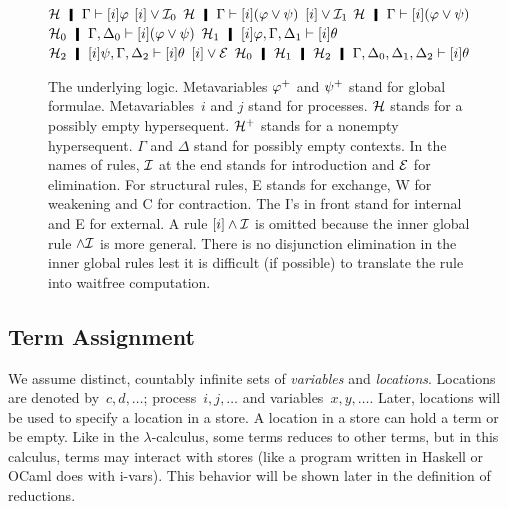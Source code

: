 \begin{figure}
  \UnaryRule
   {$\hyper\hmid\Gamma\vdash[i]\varphi$}
   {$[i]\vee\mathcal I_0$}
   {$\hyper\hmid\Gamma\vdash[i](\varphi\vee\psi)$}
   \hfill
  \UnaryRule{$\hyper\hmid\Gamma\vdash[i]\psi$}
   {$[i]\vee\mathcal I_1$}
   {$\hyper\hmid\Gamma\vdash[i](\varphi\vee\psi)$}
   \TrinaryRule
   {$\hyper_0\hmid\G,\D_0\vdash[i](\phi\vee\psi)$}
   {$\hyper_1\hmid[i]\varphi, \G,\D_1\vdash[i]\theta$}
   {$\hyper_2\hmid[i]\psi,    \G,\D_2\vdash[i]\theta$}
   {$[i]\vee\mathcal E$}
   {$\hyper_0\hmid\hyper_1\hmid\hyper_2\hmid
 \G,\D_0,\D_1,\D_2\vdash[i]\theta$}
\caption[The underlying logic of \lgd.]
 {The underlying logic.
 Metavariables ${\varphi}^+$ and ${\psi}^+$ stand for global formulae.
 Metavariables~$i$ and $j$ stand for processes.
 $\mathcal{H}$ stands for a possibly empty hypersequent.
 $\mathcal{H}^+$ stands for a nonempty hypersequent.
 $\Gamma$ and $\Delta$ stand for possibly empty contexts.
 In the names of rules, $\mathcal I$ at the end stands for introduction and $\mathcal E$ for
 elimination.  For structural rules, E stands for exchange, W for
 weakening and C for contraction.  The I's in front stand for internal and E
 for external.
 A rule $[i]\wedge\mathcal I$ is omitted because the inner global rule
 $\wedge\mathcal I$ is more general.
  There is no disjunction elimination in the inner global rules lest it
 is difficult (if possible) to translate the rule into
 waitfree computation.
 }
\label{fig:logic}
\end{figure}

\subsection{Term Assignment}
\label{term}

We assume distinct, countably infinite sets of
\textit{variables} and
\textit{locations}.
Locations are denoted by~$c,d,\ldots$; process~$i,j, \ldots$ and variables~$x,
y, \ldots$.
Later, locations will be used to specify a location in a store.
A location in a store can hold a term or be empty.
Like in the $\lambda$-calculus, some terms reduces to other
terms, but in this calculus, terms may interact with stores (like
a program written in Haskell or OCaml does with i-vars).
This behavior will be shown later in the definition of reductions.

